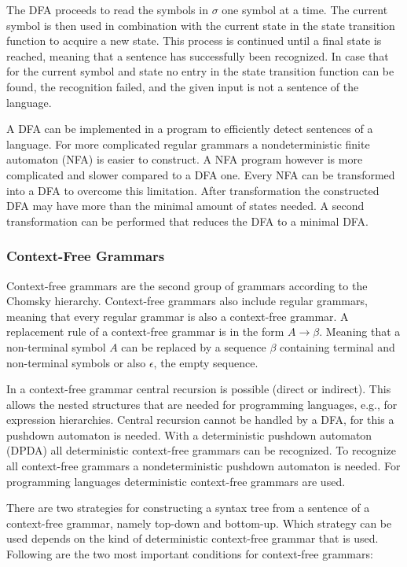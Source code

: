 The DFA proceeds to read the symbols in $\sigma$ one symbol at a time. The current symbol is then used in combination with the current state in the state transition function to acquire a new state. This process is continued until a final state is reached, meaning that a sentence has successfully been recognized. In case that for the current symbol and state no entry in the state transition function can be found, the recognition failed, and the given input is not a sentence of the language. 

A DFA can be implemented in a program to efficiently detect sentences of a language. For more complicated regular grammars a nondeterministic finite automaton (NFA) is easier to construct. A NFA program however is more complicated and slower compared to a DFA one. Every NFA can be transformed into a DFA to overcome this limitation. After transformation the constructed DFA may have more than the minimal amount of states needed. A second transformation can be performed that reduces the DFA to a minimal DFA. 

\subsubsection{Context-Free Grammars}

Context-free grammars are the second group of grammars according to the Chomsky hierarchy. Context-free grammars also include regular grammars, meaning that every regular grammar is also a context-free grammar. A replacement rule of a context-free grammar is in the form $A \rightarrow \beta$. Meaning that a non-terminal symbol $A$ can be replaced by a sequence $\beta$ containing terminal and non-terminal symbols or also $\epsilon$, the empty sequence. 

In a context-free grammar central recursion is possible (direct or indirect). This allows the nested structures that are needed for programming languages, e.g., for expression hierarchies. Central recursion cannot be handled by a DFA, for this a pushdown automaton is needed. With a deterministic pushdown automaton (DPDA) all deterministic context-free grammars can be recognized. To recognize all context-free grammars a nondeterministic pushdown automaton is needed. For programming languages deterministic context-free grammars are used. 

There are two strategies for constructing a syntax tree from a sentence of a context-free grammar, namely top-down and bottom-up. Which strategy can be used depends on the kind of deterministic context-free grammar that is used. Following are the two most important conditions for context-free grammars:

